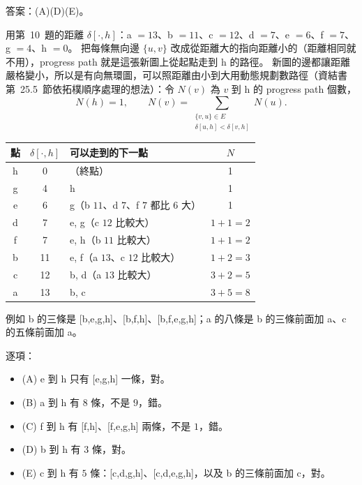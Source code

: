 \begin{pastsoln}
答案：(A)(D)(E)。

用第~10~題的距離 $\delta[\cdot, h]$：a $= 13$、b $= 11$、c $= 12$、d $= 7$、e $= 6$、f $= 7$、g $= 4$、h $= 0$。
把每條無向邊 $\{u, v\}$ 改成從距離大的指向距離小的（距離相同就不用），progress path 就是這張新圖上從起點走到
h 的路徑。 新圖的邊都讓距離嚴格變小，所以是有向無環圖，可以照距離由小到大用動態規劃數路徑（資結書
第~25.5~節依拓樸順序處理的想法）：令 $N(v)$ 為 $v$ 到 h 的 progress path 個數，
\[
N(h) = 1, \qquad N(v) = \sum_{\substack{\{v, u\} \in E \\ \delta[u, h] < \delta[v, h]}} N(u).
\]
\begin{center}
\small
\begin{tabular}{cclc}
\toprule
點 & $\delta[\cdot, h]$ & 可以走到的下一點 & $N$ \\
\midrule
h & 0 & （終點） & 1 \\
g & 4 & h & 1 \\
e & 6 & g（b $11$、d $7$、f $7$ 都比 $6$ 大） & 1 \\
d & 7 & e, g（c $12$ 比較大） & $1 + 1 = 2$ \\
f & 7 & e, h（b $11$ 比較大） & $1 + 1 = 2$ \\
b & 11 & e, f（a $13$、c $12$ 比較大） & $1 + 2 = 3$ \\
c & 12 & b, d（a $13$ 比較大） & $3 + 2 = 5$ \\
a & 13 & b, c & $3 + 5 = 8$ \\
\bottomrule
\end{tabular}
\end{center}
例如 b 的三條是 [b,e,g,h]、[b,f,h]、[b,f,e,g,h]；a 的八條是 b 的三條前面加 a、c 的五條前面加 a。

逐項：
\begin{itemize}
\item (A) e 到 h 只有 [e,g,h] 一條，對。
\item (B) a 到 h 有 $8$ 條，不是 $9$，錯。
\item (C) f 到 h 有 [f,h]、[f,e,g,h] 兩條，不是 $1$，錯。
\item (D) b 到 h 有 $3$ 條，對。
\item (E) c 到 h 有 $5$ 條：[c,d,g,h]、[c,d,e,g,h]，以及 b 的三條前面加 c，對。
\end{itemize}
\end{pastsoln}

